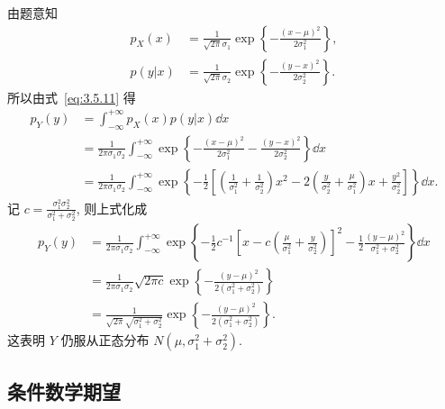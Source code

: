 	\begin{solution}
		由题意知
		\begin{align*}
			p_{X}(x)&=\frac{1}{\sqrt{2 \pi} \sigma_{1}} \exp \left\{-\frac{(x-\mu)^{2}}{2 \sigma_{1}^{2}}\right\}, \\
			p(y | x)&=\frac{1}{\sqrt{2 \pi} \sigma_{2}} \exp \left\{-\frac{(y-x)^{2}}{2 \sigma_{2}^{2}}\right\}.
		\end{align*}
		所以由式~\ref{eq:3.5.11} 得
		\begin{align*} 
			p_{Y}(y) &=\int_{-\infty}^{+\infty} p_{X}(x) p(y | x) \dd x \\
			&=\frac{1}{2 \pi \sigma_{1} \sigma_{2}} \int_{-\infty}^{+\infty}\exp \left\{-\frac{(x-\mu)^{2} }
			{2 \sigma_{1}^{2}}-\frac{(y-x)^{2}}{2 \sigma_{2}^{2}}\right\} \dd x \\
			&=\frac{1}{2 \pi \sigma_{1} \sigma_{2}} \int_{-\infty}^{+\infty} 
			\exp \left\{-\frac{1}{2}\left[\left(\frac{1}{\sigma_{1}^{2}}+\frac{1}{\sigma_{2}^{2}}\right) x^{2}-2\left(\frac{y}{\sigma_{2}^{2}}+\frac{\mu}{\sigma_{1}^{2}}\right) x+\frac{y^{2}}{\sigma_{2}^{2}}\right]\right\} \dd x .
		\end{align*}
		记 $c=\frac{\sigma_{1}^{2} \sigma_{2}^{2}}{\sigma_{1}^{2}+\sigma_{2}^{2}}$, 则上式化成
		\begin{align*}
			p_{Y}(y) &=\frac{1}{2 \pi \sigma_{1} \sigma_{2}} \int_{-\infty}^{+\infty} \exp \left\{-\frac{1}{2} c^{-1}\left[x-c\left(\frac{\mu}{\sigma_{1}^{2}}+\frac{y}{\sigma_{2}^{2}}\right)\right]^{2}-\frac{1}{2} \frac{(y-\mu)^{2}}{\sigma_{1}^{2}+\sigma_{2}^{2}}\right\} \dd x \\
			&=\frac{1}{2 \pi \sigma_{1} \sigma_{2}} \sqrt{2 \pi c} \exp \left\{-\frac{(y-\mu)^{2}}{2\left(\sigma_{1}^{2}+\sigma_{2}^{2}\right)}\right\}		\\
			&=\frac{1}{\sqrt{2 \pi} \sqrt{\sigma_{1}^{2}+\sigma_{2}^{2}}} \exp \left\{-\frac{(y-\mu)^{2}}{2\left(\sigma_{1}^{2}+\sigma_{2}^{2}\right)}\right\} .
		\end{align*}
		这表明 $Y$ 仍服从正态分布 $N(\mu,\sigma_1^2+\sigma_2^2)$.
	\end{solution}
	
	\subsection{条件数学期望}

